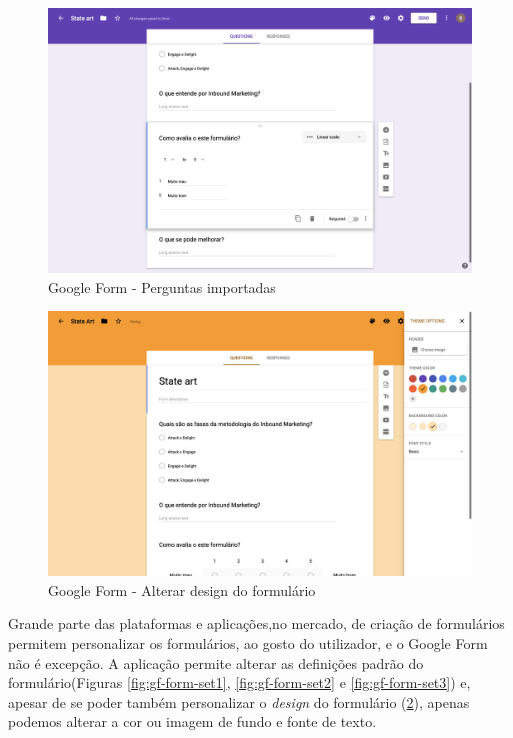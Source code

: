 \begin{figure}[h!]
	\begin{center}
		\includegraphics[width=1\textwidth]{img/gf/gf-form-imported}
		\caption{Google Form - Perguntas importadas}
		\label{fig:gf-form-imported}
	\end{center}
\end{figure}


\begin{figure}[h!]
	\begin{center}
		\includegraphics[width=1\textwidth]{img/gf/gf-form-design}
		\caption{Google Form - Alterar design do formulário}
		\label{fig:gf-form-design}
	\end{center}
\end{figure}

\newpage

Grande parte das plataformas e aplicações,no mercado, de criação de formulários permitem personalizar os formulários, ao gosto do utilizador, e o Google Form não é excepção. A aplicação permite alterar as definições padrão do formulário(Figuras \ref{fig:gf-form-set1}, \ref{fig:gf-form-set2} e \ref{fig:gf-form-set3}) e, apesar de se poder também personalizar o \textit{design} do formulário (\ref{fig:gf-form-design}), apenas podemos alterar a cor ou imagem de fundo e fonte de texto.

